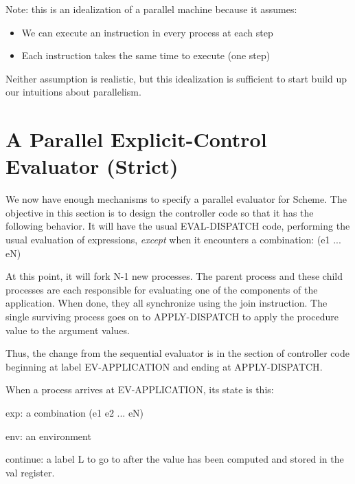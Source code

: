 Note: this is an idealization of a parallel machine because it assumes:
 \begin{itemize}
 \item We can execute an instruction in every process at each step

 \item Each instruction takes the same time to execute (one step)
\end{itemize}
 Neither assumption is realistic, but this idealization
is sufficient to start build up our intuitions about parallelism.


\section{A Parallel Explicit-Control Evaluator (Strict)}

\label{strict-eval}

We now have enough mechanisms to specify a parallel evaluator for Scheme.  The
objective in this section is to design the controller code so that it has
the following behavior.  It will have the usual {\cf EVAL-DISPATCH} code,
performing the usual evaluation of expressions, {\em except\/} when it
encounters a combination:
\beginlisp
(e1 ... eN)
\endlisp

 At this point, it will fork N-1 new processes.  The parent process
and these child processes are each responsible for evaluating one of
the components of the application.  When done, they all synchronize
using the {\cf join} instruction.  The single surviving process goes
on to {\cf APPLY-DISPATCH} to apply the procedure value to the
argument values.

Thus, the change from the sequential evaluator is in the section of
controller code beginning at label {\cf EV-APPLICATION} and ending at
{\cf APPLY-DISPATCH}.

When a process arrives at {\cf EV-APPLICATION}, its state is this:
 \begin{tightlist}
 \item {\cf exp}: a combination {\cf (e1 e2 ... eN)}

 \item {\cf env}: an environment

 \item {\cf continue}: a label L to go to after the value has been
computed and stored in the {\cf val} register.

 \end{tightlist}

